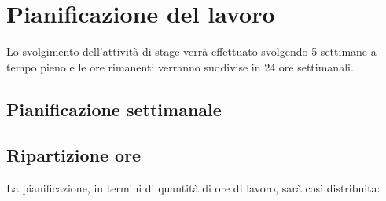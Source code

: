 
\section*{Pianificazione del lavoro}

Lo svolgimento dell'attività di stage verrà effettuato svolgendo 5 settimane a tempo pieno e le ore rimanenti verranno suddivise in 24 ore settimanali.

\subsection*{Pianificazione settimanale}
\prospettoSettimanale

\newpage

\subsection*{Ripartizione ore}

La pianificazione, in termini di quantità di ore di lavoro, sarà così distribuita:

\begin{center}
    
\end{center}

\newpage